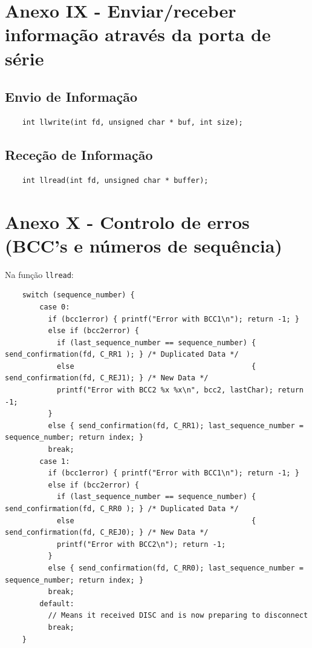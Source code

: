 \documentclass[article, a4paper, 11pt, oneside]{memoir}
\begin{document}
\section{Anexo IX - Enviar/receber informação através da porta de série}

\subsection{Envio de Informação}
\begin{lstlisting}
    int llwrite(int fd, unsigned char * buf, int size);
\end{lstlisting}

\subsection{Receção de Informação}
\begin{lstlisting}
    int llread(int fd, unsigned char * buffer);
\end{lstlisting}

\section{Anexo X - Controlo de erros (BCC's e números de sequência)}
Na função \verb|llread|:
\begin{lstlisting}
    switch (sequence_number) {
        case 0:
          if (bcc1error) { printf("Error with BCC1\n"); return -1; }
          else if (bcc2error) {
            if (last_sequence_number == sequence_number) { send_confirmation(fd, C_RR1 ); } /* Duplicated Data */
            else                                         { send_confirmation(fd, C_REJ1); } /* New Data */
            printf("Error with BCC2 %x %x\n", bcc2, lastChar); return -1;
          }
          else { send_confirmation(fd, C_RR1); last_sequence_number = sequence_number; return index; }
          break;
        case 1:
          if (bcc1error) { printf("Error with BCC1\n"); return -1; }
          else if (bcc2error) {
            if (last_sequence_number == sequence_number) { send_confirmation(fd, C_RR0 ); } /* Duplicated Data */
            else                                         { send_confirmation(fd, C_REJ0); } /* New Data */
            printf("Error with BCC2\n"); return -1;
          }
          else { send_confirmation(fd, C_RR0); last_sequence_number = sequence_number; return index; }
          break;
        default:
          // Means it received DISC and is now preparing to disconnect
          break;
    }
\end{lstlisting}
\end{document}
